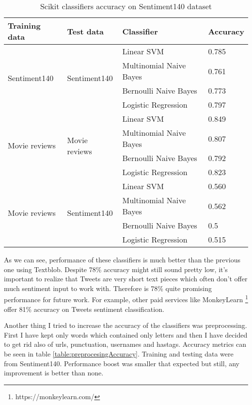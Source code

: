 \begin{table}[H]
\centering
\begin{tabular}{| p{3cm}|p{3cm}|p{5cm}|p{3cm}|}
 \hline
\textbf{ Training data }& \textbf{Test data} & \textbf{ Classifier }& \textbf{Accuracy}\\
 \hline
  \multirow{4}{*}{Sentiment140}   & \multirow{4}{*}{Sentiment140} & Linear SVM   & 0.785\\ 
    &  &  Multinomial Naive Bayes & 0.761\\ 
    &  &  Bernoulli Naive Bayes & 0.773\\  
    &  & Logistic Regression & 0.797\\ \hline 
  \multirow{4}{*}{Movie reviews}   & \multirow{4}{*}{Movie reviews} & Linear SVM   & 0.849\\ 
    &  &  Multinomial Naive Bayes & 0.807\\ 
    &  &  Bernoulli Naive Bayes & 0.792\\  
    &  & Logistic Regression & 0.823\\ \hline 
  \multirow{4}{*}{Movie reviews}   & \multirow{4}{*}{Sentiment140} & Linear SVM   & 0.560\\ 
    &  &  Multinomial Naive Bayes & 0.562\\ 
    &  &  Bernoulli Naive Bayes & 0.5\\  
    &  & Logistic Regression & 0.515\\ \hline 
\end{tabular}
\caption{Scikit classifiers accuracy on Sentiment140 dataset}
\label{table:scikitOnSentiment140}
\end{table}

As we can see, performance of these classifiers is much better than the previous one using Textblob. Despite 78\% accuracy might still sound pretty low, it's important to realize that Tweets are very short text pieces which often don't offer much sentiment input to work with. Therefore is 78\% quite promising performance for future work. For example, other paid services like MonkeyLearn \footnote{https://monkeylearn.com/} offer 81\% accuracy on Tweets sentiment classification.

Another thing I tried to increase the accuracy of the classifiers was preprocessing. First I have kept only words which contained only letters and then I have decided to get rid also of urls, punctuation, usernames and hastags. Accuracy metrics can be seen in table \ref{table:preprocesingAccuracy}. Training and testing data were from Sentiment140. Performance boost was smaller that expected but still, any improvement is better than none.

